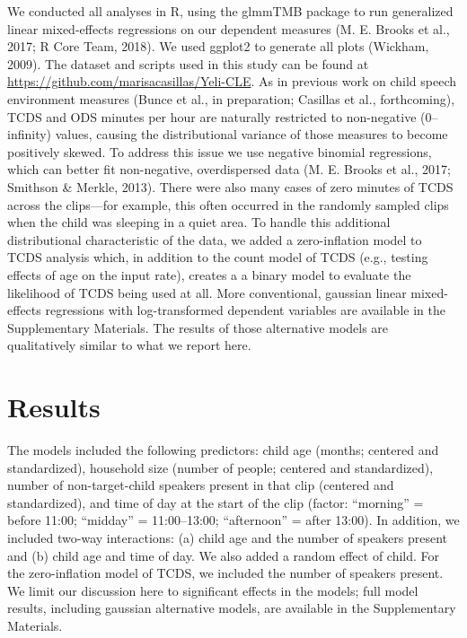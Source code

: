 \documentclass[,man,floatsintext]{apa6}
\begin{document}
We conducted all analyses in R, using the glmmTMB package to run
generalized linear mixed-effects regressions on our dependent measures
(M. E. Brooks et al., 2017; R Core Team, 2018). We used ggplot2 to
generate all plots (Wickham, 2009). The dataset and scripts used in this
study can be found at \url{https://github.com/marisacasillas/Yeli-CLE}.
As in previous work on child speech environment measures (Bunce et al.,
in preparation; Casillas et al., forthcoming), TCDS and ODS minutes per
hour are naturally restricted to non-negative (0--infinity) values,
causing the distributional variance of those measures to become
positively skewed. To address this issue we use negative binomial
regressions, which can better fit non-negative, overdispersed data (M.
E. Brooks et al., 2017; Smithson \& Merkle, 2013). There were also many
cases of zero minutes of TCDS across the clips---for example, this often
occurred in the randomly sampled clips when the child was sleeping in a
quiet area. To handle this additional distributional characteristic of
the data, we added a zero-inflation model to TCDS analysis which, in
addition to the count model of TCDS (e.g., testing effects of age on the
input rate), creates a a binary model to evaluate the likelihood of TCDS
being used at all. More conventional, gaussian linear mixed-effects
regressions with log-transformed dependent variables are available in
the Supplementary Materials. The results of those alternative models are
qualitatively similar to what we report here.

\section{Results}\label{results}

The models included the following predictors: child age (months;
centered and standardized), household size (number of people; centered
and standardized), number of non-target-child speakers present in that
clip (centered and standardized), and time of day at the start of the
clip (factor: \enquote{morning} = before 11:00; \enquote{midday} =
11:00--13:00; \enquote{afternoon} = after 13:00). In addition, we
included two-way interactions: (a) child age and the number of speakers
present and (b) child age and time of day. We also added a random effect
of child. For the zero-inflation model of TCDS, we included the number
of speakers present. We limit our discussion here to significant effects
in the models; full model results, including gaussian alternative
models, are available in the Supplementary Materials.
\end{document}
